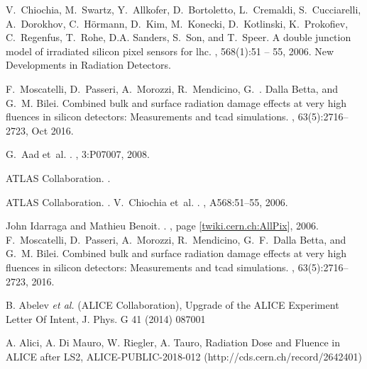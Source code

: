\begin{thebibliography}{99}
V.~Chiochia, M.~Swartz, Y.~Allkofer, D.~Bortoletto, L.~Cremaldi,
  S.~Cucciarelli, A.~Dorokhov, C.~Hörmann, D.~Kim, M.~Konecki, D.~Kotlinski,
  K.~Prokofiev, C.~Regenfus, T.~Rohe, D.A. Sanders, S.~Son, and T.~Speer.
\newblock A double junction model of irradiated silicon pixel sensors for lhc.
, 568(1):51
  -- 55, 2006.
\newblock New Developments in Radiation Detectors.

F.~{Moscatelli}, D.~{Passeri}, A.~{Morozzi}, R.~{Mendicino}, G.~. {Dalla
  Betta}, and G.~M. {Bilei}.
\newblock Combined bulk and surface radiation damage effects at very high
  fluences in silicon detectors: Measurements and tcad simulations.
, 63(5):2716--2723, Oct
  2016.


G.~Aad et~al.
.
, 3:P07007, 2008.



{{ATLAS Collaboration}}.
.

{{ATLAS Collaboration}}.
.
V.~Chiochia et~al.
.
, A568:51--55, 2006.

John Idarraga and Mathieu Benoit.
.
, page
  [\href{https://twiki.cern.ch/twiki/bin/view/Main/AllPix}{twiki.cern.ch:AllPix}],
  2006.
F.~Moscatelli, D.~Passeri, A.~Morozzi, R.~Mendicino, G.~F.~Dalla Betta, and
  G.~M. Bilei.
\newblock Combined bulk and surface radiation damage effects at very high
  fluences in silicon detectors: Measurements and tcad simulations.
, 63(5):2716--2723, 2016.

 B. Abelev {\it et al.} (ALICE Collaboration), Upgrade of the ALICE Experiment Letter Of Intent,
J. Phys. G 41 (2014) 087001

 A. Alici, A. Di Mauro, W. Riegler, A. Tauro, Radiation Dose and Fluence in ALICE after LS2,
ALICE-PUBLIC-2018-012 (http://cds.cern.ch/record/2642401)


\end{thebibliography}
